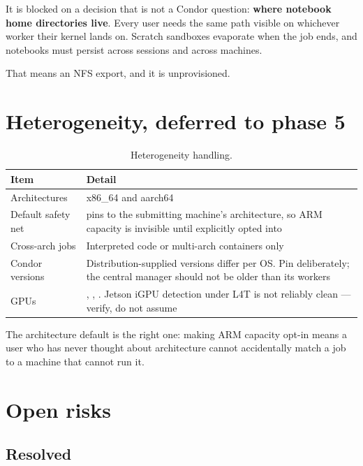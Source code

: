\begin{keypoint}
It is blocked on a decision that is not a Condor question: \textbf{where notebook
home directories live}. Every user needs the same path visible on whichever
worker their kernel lands on. Scratch sandboxes evaporate when the job ends, and
notebooks must persist across sessions and across machines.
\end{keypoint}

That means an NFS export, and it is unprovisioned.

\section{Heterogeneity, deferred to phase 5}

\begin{table}[H]
\centering
\begin{tabularx}{\textwidth}{L{0.24\textwidth} Y}
\toprule
\textbf{Item} & \textbf{Detail} \\
\midrule
Architectures & x86\_64 and aarch64 \\
Default safety net &  pins  to the submitting machine's architecture, so ARM capacity is invisible until explicitly opted into \\
Cross-arch jobs & Interpreted code or multi-arch containers only \\
Condor versions & Distribution-supplied versions differ per OS. Pin deliberately; the central manager should not be older than its workers \\
GPUs & , , . Jetson iGPU detection under L4T is not reliably clean --- verify, do not assume \\
\bottomrule
\end{tabularx}
\caption{Heterogeneity handling.}
\end{table}

The architecture default is the right one: making ARM capacity opt-in means a
user who has never thought about architecture cannot accidentally match a job to
a machine that cannot run it.

\section{Open risks}

\subsection{Resolved}

